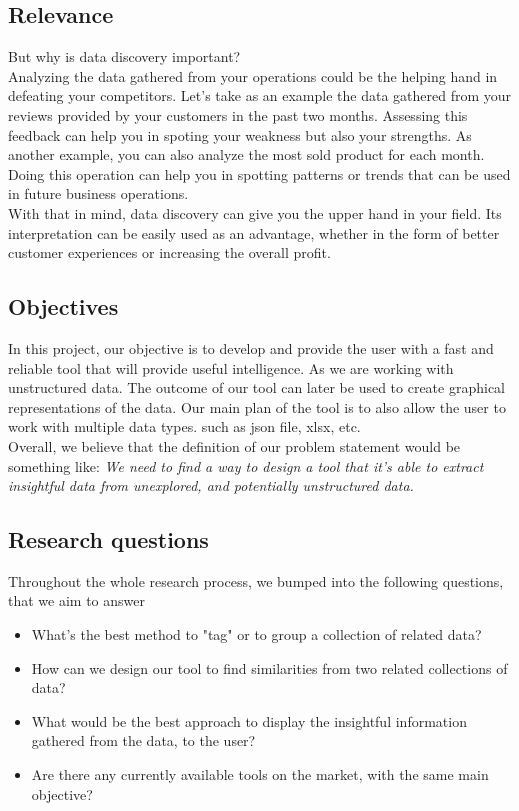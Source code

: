\subsection{Relevance}
But why is data discovery important? 
\vspace{5mm} %
\\Analyzing the data gathered from your operations could be the helping hand in defeating your competitors. Let's take as an example the data gathered from your reviews provided by your customers in the past two months. Assessing this feedback can help you in spoting your weakness but also your strengths. As another example, you can also analyze the most sold product for each month. Doing this operation can help you in spotting patterns or trends that can be used in future business operations. 
\vspace{5mm} %
\\With that in mind, data discovery can give you the upper hand in your field. Its interpretation can be easily used as an advantage, whether in the form of better customer experiences or increasing the overall profit.

\subsection{Objectives}
In this project, our objective is to develop and provide the user with a fast and reliable tool that will provide useful intelligence. As we are working with unstructured data. The outcome of our tool can later be used to create graphical representations of the data. Our main plan of the tool is to also allow the user to work with multiple data types. such as json file, xlsx, etc.
\vspace{5mm} %
\\Overall, we believe that the definition of our problem statement would be something like: \textit{We need to find a way to design a tool that it's able to extract insightful data from unexplored, and potentially unstructured data.}

\subsection{Research questions}
Throughout the whole research process, we bumped into the following questions, that we aim to answer
\begin{itemize}
    \item What's the best method to "tag" or to group a collection of related data?
    \item How can we design our tool to find similarities from two related collections of data?
    \item What would be the best approach to display the insightful information gathered from the data, to the user?
    \item Are there any currently available tools on the market, with the same main objective?
\end{itemize}

